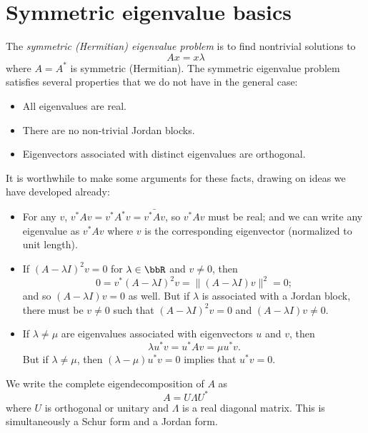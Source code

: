 \section{Symmetric eigenvalue basics}


The {\em symmetric (Hermitian) eigenvalue problem} is to find nontrivial
solutions to
\[
  A x = x \lambda
\]
where $A = A^*$ is symmetric (Hermitian).  The symmetric eigenvalue
problem satisfies several properties that we do not have in the general
case:
\begin{itemize}
\item
  All eigenvalues are real.
\item
  There are no non-trivial Jordan blocks.
\item
  Eigenvectors associated with distinct eigenvalues are orthogonal.
\end{itemize}
It is worthwhile to make some arguments for these facts, drawing
on ideas we have developed already:
\begin{itemize}
\item
  For any $v$, $v^* A v = v^* A^* v = \bar{v^* A v}$, so $v^* A v$
  must be real; and we can write any eigenvalue as $v^* A v$ where $v$
  is the corresponding eigenvector (normalized to unit length).
\item
  If $(A-\lambda I)^2 v = 0$ for $\lambda \in \bbR$ and $v \neq 0$, then
  \[
    0 = v^* (A-\lambda I)^2 v = \|(A-\lambda I) v\|^2 = 0;
  \]
  and so $(A-\lambda I) v = 0$ as well.
  But if $\lambda$ is associated with a Jordan block, there must
  be $v \neq 0$ such that $(A-\lambda I)^2 v = 0$ and
  $(A-\lambda I) v \neq 0$.
\item
  If $\lambda \neq \mu$ are eigenvalues associated with eigenvectors
  $u$ and $v$, then
  \[
    \lambda u^* v = u^* A v = \mu u^* v.
  \]
  But if $\lambda \neq \mu$, then $(\lambda-\mu) u^* v = 0$ implies
  that $u^* v = 0$.
\end{itemize}

We write the complete eigendecomposition of $A$ as
\[
  A = U \Lambda U^*
\]
where $U$ is orthogonal or unitary and $\Lambda$ is a real diagonal
matrix.  This is simultaneously a Schur form and a Jordan form.

